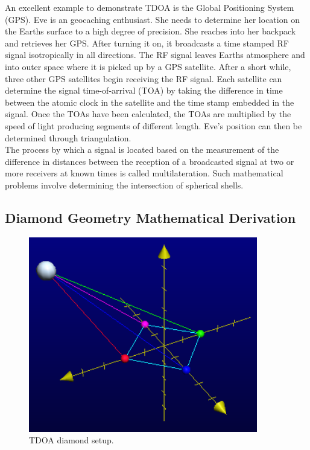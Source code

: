 \documentclass[12pt]{article}
\begin{document}
\noindent An excellent example to demonstrate TDOA is the Global Positioning System (GPS). Eve is an geocaching enthusiast. She needs to determine her location on the Earths surface to a high degree of precision. She reaches into her backpack and retrieves her GPS. After turning it on, it broadcasts a time stamped RF signal isotropically in all directions. The RF signal leaves Earths atmosphere and into outer space where it is picked up by a GPS satellite. After a short while, three other GPS satellites begin receiving the RF signal. Each satellite can determine the signal time-of-arrival (TOA) by taking the difference in time between the atomic clock in the satellite and the time stamp embedded in the signal. Once the TOAs have been calculated, the TOAs are multiplied by the speed of light producing segments of different length. Eve's position can then be determined through triangulation.\\

\noindent The process by which a signal is located based on the measurement of the difference in distances between the reception of a broadcasted signal at two or more receivers at known times is called multilateration. Such mathematical problems involve determining the intersection of spherical shells.
    
\subsection{Diamond Geometry Mathematical Derivation}
\begin{figure}[!h]
	\centering
	\includegraphics[width=10.0cm]{Pics_and_Figs/TDOA_Diamond_Visual.png}
    \caption{TDOA diamond setup.} \label{fig:TDOA Diamond Visual}
\end{figure}  
\end{document}

